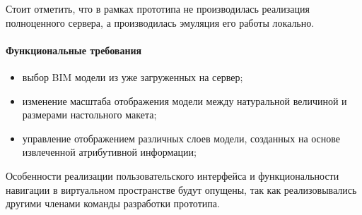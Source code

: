 Стоит отметить, что в рамках прототипа не производилась реализация полноценного сервера,
а производилась эмуляция его работы локально.

\paragraph{Функциональные требования}
\begin{itemize}
    \item выбор BIM модели из уже загруженных на сервер;
    \item изменение масштаба отображения модели
    между натуральной величиной и размерами настольного макета;
    \item управление отображением различных слоев модели,
    созданных на основе извлеченной атрибутивной информации;
\end{itemize}

Особенности реализации пользовательского интерфейса и
функциональности навигации в виртуальном пространстве будут опущены,
так как реализовывались другими членами команды разработки прототипа.